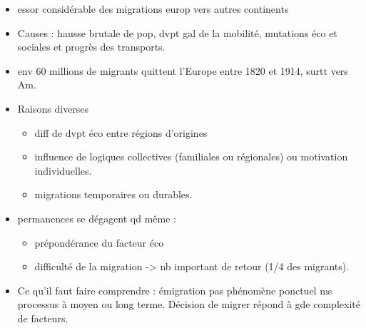 \documentclass{beamer}
\begin{document}
\begin{frame}
\begin{itemize}
\item essor considérable des migrations europ vers autres continents
\item Causes :  hausse brutale de pop, dvpt gal de la mobilité, mutations éco et sociales et progrès des transports.
\item env 60 millions de migrants quittent l'Europe entre 1820 et 1914, surtt vers Am. 
\item Raisons diverses
\begin{itemize}
\item diff de dvpt éco entre régions d'origines
\item influence de logiques collectives (familiales ou régionales)  ou motivation individuelles.
\item migrations temporaires ou durables.
\end{itemize}

\item permanences se dégagent qd même : 
\begin{itemize}
\item prépondérance du facteur éco
\item difficulté de la migration -> nb important de retour (1/4 des migrants).
\end{itemize}

\item Ce qu'il faut faire comprendre : émigration pas phénomène ponctuel ms processus à moyen ou long terme. Décision de migrer répond à gde complexité de facteurs.
\end{itemize}


\end{frame}

  
\end{document}
